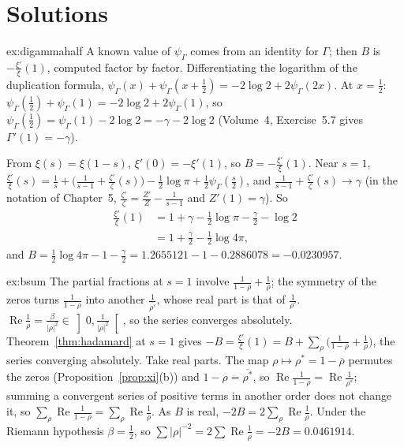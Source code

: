\section{Solutions}

\begin{solution}{ex:digammahalf}
\idea A known value of $\psi_\Gamma$ comes from an identity for $\Gamma$; then $B$ is $-\frac{\xi'}\xi(1)$, computed factor by factor.
\writeup Differentiating the logarithm of the duplication formula, $\psi_\Gamma(x)+\psi_\Gamma(x+\frac12)=-2\log2+2\psi_\Gamma(2x)$. At $x=\frac12$: $\psi_\Gamma(\frac12)+\psi_\Gamma(1)=-2\log2+2\psi_\Gamma(1)$, so
$\psi_\Gamma(\frac12)=\psi_\Gamma(1)-2\log2=-\gamma-2\log2$ (Volume~4, Exercise~5.7 gives $\Gamma'(1)=-\gamma$).

From $\xi(s)=\xi(1-s)$, $\xi'(0)=-\xi'(1)$, so $B=-\frac{\xi'}\xi(1)$. Near $s=1$, $\frac{\xi'}\xi(s)=\frac1s+\bigl(\frac1{s-1}+\frac{\zeta'}\zeta(s)\bigr)-\frac12\log\pi+\frac12\psi_\Gamma(\frac s2)$, and
$\frac1{s-1}+\frac{\zeta'}\zeta(s)\to\gamma$ (in the notation of Chapter~5, $\frac{\zeta'}\zeta=\frac{Z'}Z-\frac1{s-1}$ and $Z'(1)=\gamma$). So
\[
\begin{aligned}\frac{\xi'}\xi(1)&=1+\gamma-\frac12\log\pi-\frac\gamma2-\log2\\&=1+\frac\gamma2-\frac12\log4\pi,\end{aligned}
\]
and $B=\frac12\log4\pi-1-\frac\gamma2=1.2655121-1-0.2886078=-0.0230957$.
\end{solution}

\begin{solution}{ex:bsum}
\idea The partial fractions at $s=1$ involve $\frac1{1-\rho}+\frac1\rho$; the symmetry of the zeros turns $\frac1{1-\rho}$ into another $\frac1{\overline{\rho'}}$, whose real part is that of $\frac1{\rho'}$.
\writeup $\operatorname{Re}\frac1\rho=\frac\beta{|\rho|^2}\in\left]0,\frac1{|\rho|^2}\right[$, so the series converges absolutely. Theorem~\ref{thm:hadamard} at $s=1$ gives $-B=\frac{\xi'}\xi(1)=B+\sum_\rho\bigl(\frac1{1-\rho}+\frac1\rho\bigr)$,
the series converging absolutely. Take real parts. The map $\rho\mapsto\rho^*=1-\overline\rho$ permutes the zeros (Proposition~\ref{prop:xi}(b)) and $1-\rho=\overline{\rho^*}$, so
$\operatorname{Re}\frac1{1-\rho}=\operatorname{Re}\frac1{\rho^*}$; summing a convergent series of positive terms in another order does not change it, so $\sum_\rho\operatorname{Re}\frac1{1-\rho}=\sum_\rho\operatorname{Re}\frac1\rho$. As $B$ is real,
$-2B=2\sum_\rho\operatorname{Re}\frac1\rho$. Under the Riemann hypothesis $\beta=\frac12$, so $\sum|\rho|^{-2}=2\sum\operatorname{Re}\frac1\rho=-2B=0.0461914$.
\end{solution}

